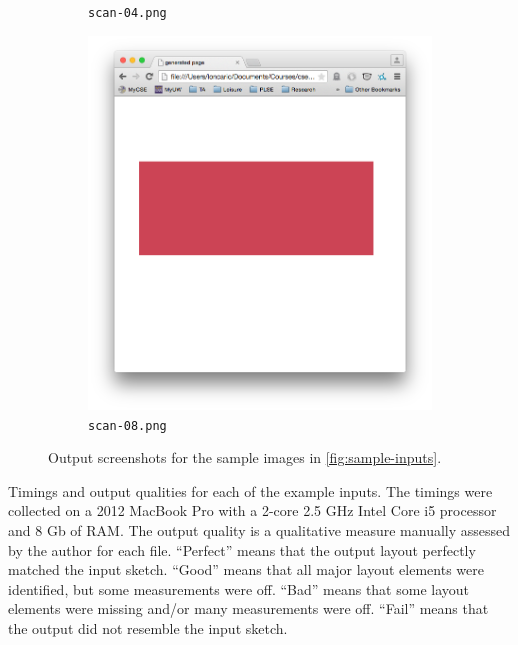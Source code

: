 \documentclass{article}
\begin{document}
\begin{figure}[h]
\begin{center}
\begin{subfigure}[b]{0.3\textwidth}
        \caption{\texttt{scan-04.png}}
    \end{subfigure}
    \begin{subfigure}[b]{0.3\textwidth}
        \includegraphics[width=\textwidth]{scan-08-output.png}
        \caption{\texttt{scan-08.png}}
    \end{subfigure}
\end{center}
\caption{Output screenshots for the sample images in
\autoref{fig:sample-inputs}.}
\label{fig:sample-outputs}
\end{figure}

\begin{table}[h]
\begin{center}

\end{center}
\caption{Timings and output qualities for each of the example inputs. The
    timings were collected on a 2012 MacBook Pro with a 2-core 2.5 GHz Intel
    Core i5 processor and 8 Gb of RAM. The output quality is a qualitative
    measure manually assessed by the author for each file. ``Perfect'' means
    that the output layout perfectly matched the input sketch. ``Good'' means
    that all major layout elements were identified, but some measurements were
    off. ``Bad'' means that some layout elements were missing and/or many
    measurements were off. ``Fail'' means that the output did not resemble the
    input sketch.}
\label{tbl:benchmarks}
\end{table}
\end{document}
